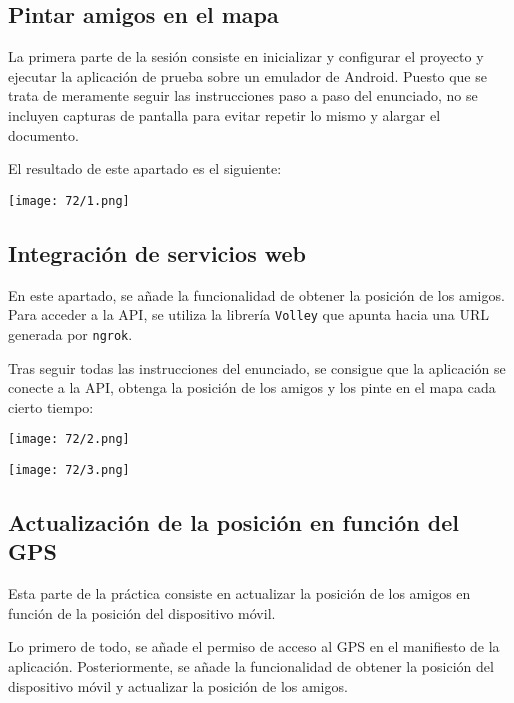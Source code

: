 \subsection{Pintar amigos en el mapa}
La primera parte de la sesión consiste en inicializar y configurar el proyecto y
ejecutar la aplicación de prueba sobre un emulador de Android. Puesto que se trata
de meramente seguir las instrucciones paso a paso del enunciado, no se incluyen
capturas de pantalla para evitar repetir lo mismo y alargar el documento.

El resultado de este apartado es el siguiente:

\begin{minipage}{\linewidth}
	\centering
	\texttt{[image: 72/1.png]}
	\label{fig:72/1}
\end{minipage}

\subsection{Integración de servicios web}
En este apartado, se añade la funcionalidad de obtener la posición de los amigos. Para acceder
a la API, se utiliza la librería \Verb#Volley# que apunta hacia una URL generada por \Verb#ngrok#.

Tras seguir todas las instrucciones del enunciado, se consigue que la aplicación se conecte a la API,
obtenga la posición de los amigos y los pinte en el mapa cada cierto tiempo:

\begin{minipage}{\linewidth}
	\centering
	\texttt{[image: 72/2.png]}
	\label{fig:72/2}
\end{minipage}

\begin{minipage}{\linewidth}
	\centering
	\texttt{[image: 72/3.png]}
	\label{fig:72/3}
\end{minipage}

\subsection{Actualización de la posición en función del GPS}
Esta parte de la práctica consiste en actualizar la posición de los amigos en función de la
posición del dispositivo móvil.

Lo primero de todo, se añade el permiso de acceso al GPS en el manifiesto de la aplicación.
Posteriormente, se añade la funcionalidad de obtener la posición del dispositivo móvil y
actualizar la posición de los amigos.

